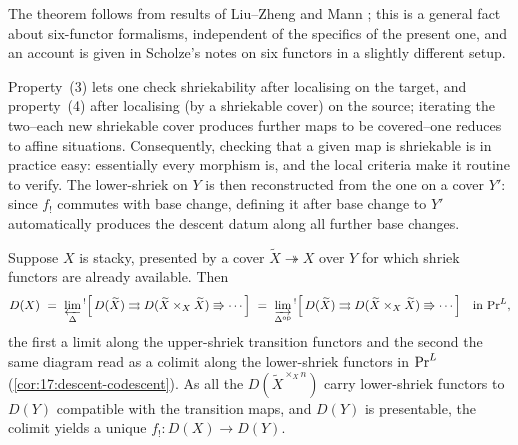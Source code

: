 The theorem follows from results of Liu--Zheng \cite{liu2024enhancedoperationsbasechange}
and Mann \cite{mann2022padic6functorformalismrigidanalytic}; this is a general
fact about six-functor formalisms, independent of the specifics of the present
one, and an account is given in Scholze's notes on six functors
\cite{scholze2023six} in a slightly different setup.

\begin{remark}
\label{rmk:21:localise}
Property~(3) lets one check shriekability after localising on the target, and
property~(4) after localising (by a shriekable cover) on the source; iterating
the two--each new shriekable cover produces further maps to be covered--one
reduces to affine situations. Consequently, checking that a given map is
shriekable is in practice easy: essentially every morphism is, and the local
criteria make it routine to verify. The lower-shriek on $Y$ is then reconstructed
from the one on a cover $Y'$: since $f_!$ commutes with base change, defining it
after base change to $Y'$ automatically produces the descent datum along all
further base changes.
\end{remark}

\begin{example}
\label{ex:21:reconstruct-fshriek}
Suppose $X$ is stacky, presented by a cover $\widetilde X\twoheadrightarrow X$
over $Y$ for which shriek functors are already available. Then
\begin{equation*}
D(X)\ =\ \varprojlim_{\Delta}{}^{!}\Bigl[\,D(\widetilde X)\rightrightarrows
D(\widetilde X\times_X\widetilde X)\Rrightarrow\cdots\Bigr]\ =\
\varinjlim_{\Delta^{\mathrm{op}}}{}^{!}\Bigl[\,D(\widetilde X)\rightrightarrows
D(\widetilde X\times_X\widetilde X)\Rrightarrow\cdots\Bigr]\quad\text{in }\PrL,
\end{equation*}
the first a limit along the upper-shriek transition functors and the second the
same diagram read as a colimit along the lower-shriek functors in $\mathrm{Pr}^{L}$
(\cref{cor:17:descent-codescent}). As all the $D(\widetilde X^{\times_X n})$
carry lower-shriek functors to $D(Y)$ compatible with the transition maps, and
$D(Y)$ is presentable, the colimit yields a unique $f_!\colon D(X)\to D(Y)$.
\end{example}


